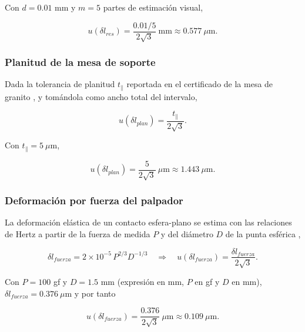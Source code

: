 Con $d = 0.01$ mm y $m = 5$ partes de estimación visual,

\begin{equation}
  u(\delta l_{res}) =
  \frac{0.01/5}{2\sqrt{3}}\ \text{mm}
  \approx 0.577\ \mu\text{m}.
  \label{eq:reloj-sigma-res-valor}
\end{equation}

\subsubsection*{Planitud de la mesa de soporte}

Dada la tolerancia de planitud $t_{\parallel}$ reportada en el certificado de la mesa
de granito \parencite{cem_di010}, y tomándola como ancho total del intervalo,

\begin{equation}
  u(\delta l_{plan}) = \frac{t_{\parallel}}{2\sqrt{3}}.
  \label{eq:reloj-sigma-plan}
\end{equation}

Con $t_{\parallel} = 5\ \mu\text{m}$,

\begin{equation}
  u(\delta l_{plan}) =
  \frac{5}{2\sqrt{3}}\ \mu\text{m}
  \approx 1.443\ \mu\text{m}.
  \label{eq:reloj-sigma-plan-valor}
\end{equation}

\subsubsection*{Deformación por fuerza del palpador}

La deformación elástica de un contacto esfera-plano se estima con las relaciones de
Hertz a partir de la fuerza de medida $P$ y del diámetro $D$ de la punta esférica
\parencite{axiospec_dial},

\begin{equation}
  \delta l_{fuerza} = 2\times10^{-5}\, P^{2/3} D^{-1/3}
  \quad\Longrightarrow\quad
  u(\delta l_{fuerza}) = \frac{\delta l_{fuerza}}{2\sqrt{3}}.
  \label{eq:reloj-sigma-fuerza}
\end{equation}

Con $P = 100$ gf y $D = 1.5$ mm (expresión en mm, $P$ en gf y $D$ en mm),
$\delta l_{fuerza} = 0.376\ \mu\text{m}$ y por tanto

\begin{equation}
  u(\delta l_{fuerza}) =
  \frac{0.376}{2\sqrt{3}}\ \mu\text{m}
  \approx 0.109\ \mu\text{m}.
  \label{eq:reloj-sigma-fuerza-valor}
\end{equation}

